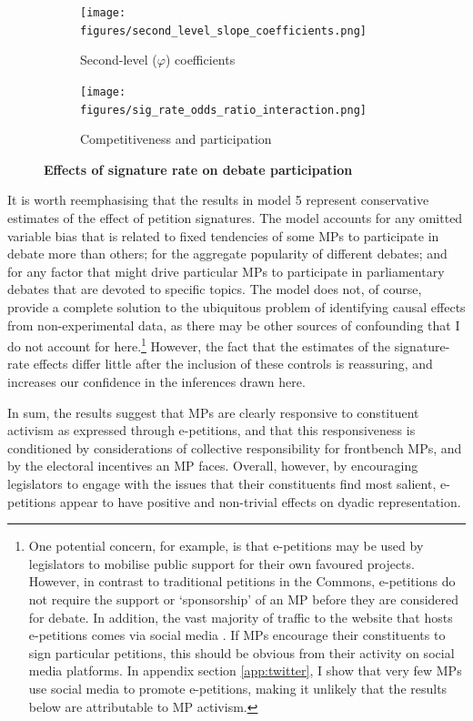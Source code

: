 \documentclass[12pt]{article}
\begin{document}
\begin{figure}[t]
\centering

\begin{subfigure}[b]{.49\textwidth}
\caption{Second-level ($\varphi$) coefficients}
\texttt{[image: figures/second\_level\_slope\_coefficients.png]}

\end{subfigure}
\begin{subfigure}[b]{.49\textwidth}
\caption{Competitiveness and participation}
\texttt{[image: figures/sig\_rate\_odds\_ratio\_interaction.png]}

\end{subfigure}
\caption{\label{fig:subnationalmargins} \textbf{Effects of signature rate on debate participation} }
\end{figure}

It is worth reemphasising that the results in model 5 represent conservative estimates of the effect of petition signatures. The model accounts for any omitted variable bias that is related to fixed tendencies of some MPs to participate in debate more than others; for the aggregate popularity of different debates; and for any factor that might drive particular MPs to participate in parliamentary debates that are devoted to specific topics. The model does not, of course, provide a complete solution to the ubiquitous problem of identifying causal effects from non-experimental data, as there may be other sources of confounding that I do not account for here.\footnote{One potential concern, for example, is that e-petitions may be used by legislators to mobilise public support for their own favoured projects. However, in contrast to traditional petitions in the Commons, e-petitions do not require the support or `sponsorship' of an MP before they are considered for debate. In addition, the vast majority of traffic to the website that hosts e-petitions comes via social media \citep[11]{yasseri2017rapid}. If MPs encourage their constituents to sign particular petitions, this should be obvious from their activity on social media platforms. In appendix section \ref{app:twitter}, I show that very few MPs use social media to promote e-petitions, making it unlikely that the results below are attributable to MP activism.}  However, the fact that the estimates of the signature-rate effects differ little after the inclusion of these controls is reassuring, and increases our confidence in the inferences drawn here.

In sum, the results suggest that MPs are clearly responsive to constituent activism as expressed through e-petitions, and that this responsiveness is conditioned by considerations of collective responsibility for frontbench MPs, and by the electoral incentives an MP faces. Overall, however, by encouraging legislators to engage with the issues that their constituents find most salient, e-petitions appear to have positive and non-trivial effects on dyadic representation. 
\end{document}
